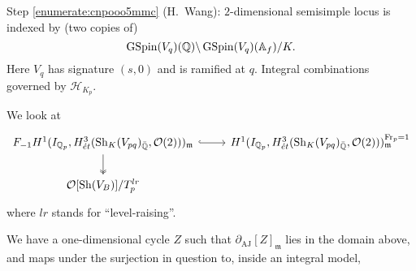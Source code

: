 \documentclass[reqno]{amsart} 
\begin{document}
Step \eqref{enumerate:cnpooo5mmc} (H.\ Wang): $2$-dimensional semisimple locus is indexed by (two copies of)
\begin{equation*}
  \operatorname{GSpin}(V_q)(\mathbb{Q}) \backslash \operatorname{GSpin}(V_q)(\mathbb{A}_f) / K.
\end{equation*}
Here $V_q$ has signature $(s, 0)$ and is ramified at $q$.  Integral combinations governed by $\mathcal{H}_{K_p}$.

We look at
\begin{equation*}
  \begin{tikzcd}
    F_{- 1} H^1(I_{\mathbb{Q}_p}, H_{\acute{e}t}^3(\operatorname{Sh}_K(V_{p q})_{\bar{\mathbb{Q}}}, \mathcal{O}(2)))_{\mathfrak{m}}
    \arrow[r, hookrightarrow] & H^1(I_{\mathbb{Q}_p}, H^3_{\acute{e}t}
    (\operatorname{Sh}_K(V_{p q})_{\bar{\mathbb{Q}}}, \mathcal{O}(2)))^{\operatorname{Fr}_p = 1}_{\mathfrak{m}} \\
    \mathcal{O}[\operatorname{Sh}(V_B)] / T_p^{l r} \arrow[u, twoheadleftarrow] &
  \end{tikzcd}
\end{equation*}
where $l r$ stands for ``level-raising''.

We have a one-dimensional cycle $Z$ such that $\partial_{\mathrm{A J}}[Z]_{\mathfrak{m}}$ lies in the domain above, and maps under the surjection in question to, inside an integral model, 
\end{document}
